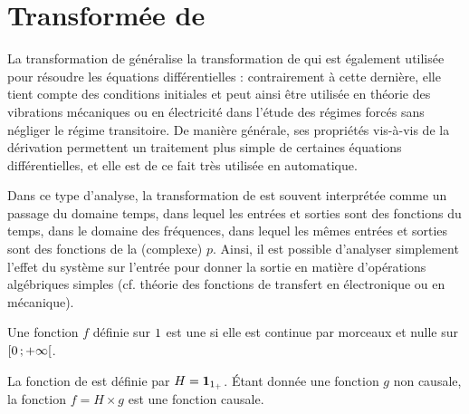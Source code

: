 \section{Transformée de } 
\label{transformee_laplace}


La transformation de  généralise la transformation de  qui est également utilisée pour résoudre les équations différentielles : contrairement à cette dernière, elle tient compte des conditions initiales et peut ainsi être utilisée en théorie des vibrations mécaniques ou en électricité dans l'étude des régimes forcés sans négliger le régime transitoire. De manière générale, ses propriétés vis-à-vis de la dérivation permettent un traitement plus simple de certaines équations différentielles, et elle est de ce fait très utilisée en automatique.

Dans ce type d'analyse, la transformation de  est souvent interprétée comme un passage du domaine temps, dans lequel les entrées et sorties sont des fonctions du temps, dans le domaine des fréquences, dans lequel les mêmes entrées et sorties sont des fonctions de la  (complexe) $p$. Ainsi, il est possible d'analyser simplement l'effet du système sur l'entrée pour donner la sortie en matière d'opérations algébriques simples (cf. théorie des fonctions de transfert en électronique ou en mécanique). 

\begin{defi}
\begin{comment}
\begin{itemize}
    \item On appelle \definir{fonction causale} une fonction définie sur $\R$ dont le support est borné à gauche en $0$ \emph{i.e.} $f$ est nulle pour tout $x < 0$. 
    \item On appelle fonction causale toute fonction définie sur $\R$, nulle sur $\interoo{-\infty}{0}$ et continue par morceaux sur $\interfo{0}{+\infty}$.
\end{itemize}
\end{comment}
Une fonction $f$ définie sur $1$ est une  si elle est continue par morceaux et nulle sur $\left[0\,;+\infty\right[$.
\end{defi}


\begin{remarque}
La fonction de  est définie par $H = \mathbf{1}_{1_+}$. Étant donnée une fonction $g$ non causale, la fonction $f = H \times g$ est une fonction causale.
\end{remarque}

